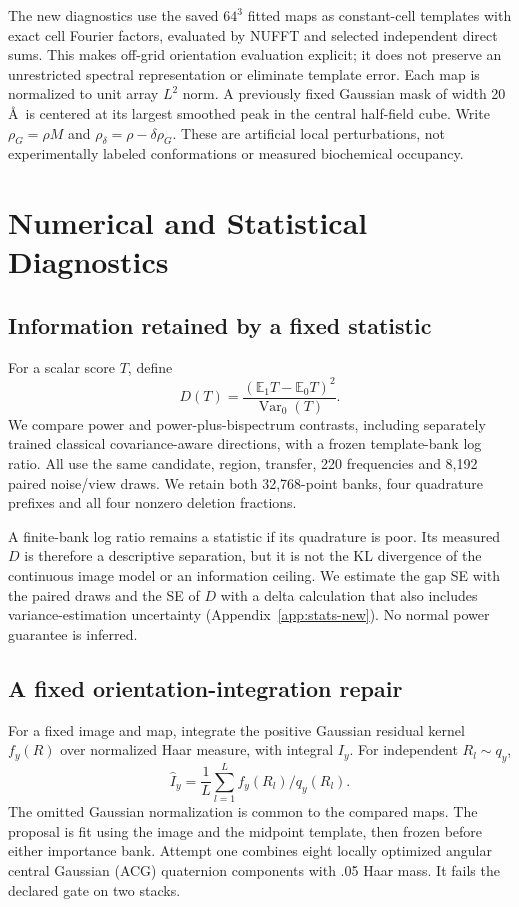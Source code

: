 \documentclass{article}
\newcommand{\E}{\mathbb E}
\begin{document}
The new diagnostics use the saved $64^3$ fitted maps as constant-cell
templates with exact cell Fourier factors, evaluated by NUFFT and selected
independent direct sums. This makes off-grid orientation evaluation explicit;
it does not preserve an unrestricted spectral representation or eliminate
template error. Each map is normalized to unit array $L^2$ norm. A previously
fixed Gaussian mask of width 20\,\AA\ is centered at its largest smoothed
peak in the central half-field cube. Write $\rho_G=\rho M$ and
$\rho_\delta=\rho-\delta\rho_G$. These are artificial local perturbations,
not experimentally labeled conformations or measured biochemical occupancy.

\section{Numerical and Statistical Diagnostics}
\subsection{Information retained by a fixed statistic}
For a scalar score $T$, define
\begin{equation}\label{eq:separation-new}
D(T)=\frac{(\E_1T-\E_0T)^2}{\operatorname{Var}_0(T)}.
\end{equation}
We compare power and power-plus-bispectrum contrasts, including separately
trained classical covariance-aware directions, with a frozen template-bank
log ratio. All use the same candidate, region, transfer, 220 frequencies and
8,192 paired noise/view draws. We retain both 32,768-point banks, four
quadrature prefixes and all four nonzero deletion fractions.

A finite-bank log ratio remains a statistic if its quadrature is poor.
Its measured $D$ is therefore a descriptive separation, but it is not the
KL divergence of the continuous image model or an information ceiling.
We estimate the gap SE with the paired draws and the SE of $D$ with a
delta calculation that also includes variance-estimation uncertainty
(Appendix~\ref{app:stats-new}). No normal power guarantee is inferred.

\subsection{A fixed orientation-integration repair}
For a fixed image and map, integrate the positive Gaussian residual kernel
$f_y(R)$ over normalized Haar measure, with integral $I_y$.
For independent $R_l\sim q_y$,
\begin{equation}
 \widehat I_y=\frac1L\sum_{l=1}^L f_y(R_l)/q_y(R_l).
\end{equation}
The omitted Gaussian normalization is common to the compared maps.
The proposal is fit using the image and the midpoint template, then frozen
before either importance bank. Attempt one combines eight locally optimized
angular central Gaussian (ACG) quaternion components with .05 Haar mass.
It fails the declared gate on two stacks.
\end{document}
